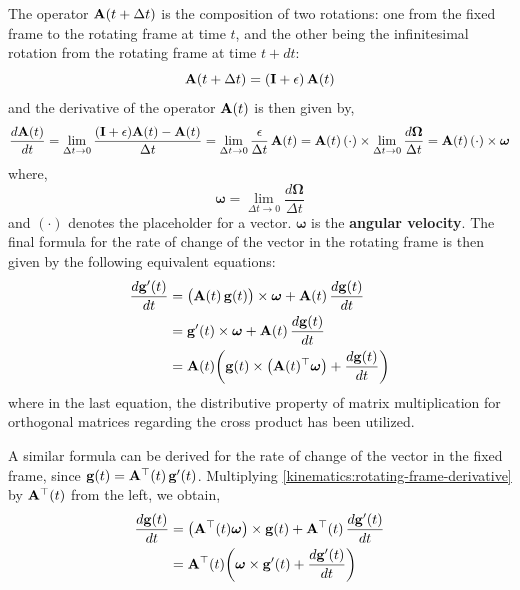 \documentclass[12pt]{article}
\begin{document}
The operator $\vb{A}(t+\Delta t)$ is the composition of two rotations: one from the fixed
frame to the rotating frame at time $t$, and the other being the infinitesimal rotation from
the rotating frame at time $t + dt$:
\begin{equation}
  \vb{A}(t+\Delta t) = (\vb{I} + \epsilon)\,\vb{A}(t)
\end{equation}
and the derivative of the operator $\vb{A}(t)$ is then given by,
\begin{equation}
  \frac{d\vb{A}(t)}{dt}
  = \lim_{\Delta t\to 0}\frac{(\vb{I}+\epsilon)\vb{A}(t) - \vb{A}(t)}{\Delta t}
  = \lim_{\Delta t\to 0}\frac{\epsilon}{\Delta t}\,\vb{A}(t)
  = \vb{A}(t)\,(\cdot)\times\lim_{\Delta t\to 0}\frac{d\boldsymbol{\Omega}}{\Delta t}
  = \vb{A}(t)\,(\cdot)\times\boldsymbol{\omega}
\end{equation}
where,
\begin{equation}
  \boldsymbol{\omega} = \lim_{\Delta t\to 0}\frac{d\boldsymbol{\Omega}}{\Delta t}
\end{equation}
and $(\cdot)$ denotes the placeholder for a vector. $\boldsymbol{\omega}$ is the
\textbf{angular velocity}. The final formula for the rate of change of the vector in the
rotating frame is then given by the following equivalent equations:
\begin{align}
  \frac{d\vb{g}'(t)}{dt}
    &= \bigl(\vb{A}(t)\,\vb{g}(t)\bigr) \times \boldsymbol{\omega}
       + \vb{A}(t)\,\frac{d\vb{g}(t)}{dt} \nonumber \\
    &= \vb{g}'(t) \times \boldsymbol{\omega} + \vb{A}(t)\,\frac{d\vb{g}(t)}{dt} \nonumber \\
    &= \vb{A}(t)\!\left(\vb{g}(t) \times \bigl(\vb{A}(t)^\top\boldsymbol{\omega}\bigr)
       + \frac{d\vb{g}(t)}{dt}\right)
  \label{kinematics:rotating-frame-derivative}
\end{align}
where in the last equation, the distributive property of matrix multiplication for orthogonal
matrices regarding the cross product has been utilized.

A similar formula can be derived for the rate of change of the vector in the fixed frame,
since $\vb{g}(t) = \vb{A}^\top(t)\,\vb{g}'(t)$. Multiplying \eqref{kinematics:rotating-frame-derivative} by
$\vb{A}^\top(t)$ from the left, we obtain,
\begin{align}
  \frac{d\vb{g}(t)}{dt}
    &= \bigl(\vb{A}^\top(t)\boldsymbol{\omega}\bigr) \times \vb{g}(t)
       + \vb{A}^\top(t)\,\frac{d\vb{g}'(t)}{dt} \nonumber \\
    &= \vb{A}^\top(t)\!\left(\boldsymbol{\omega} \times \vb{g}'(t)
       + \frac{d\vb{g}'(t)}{dt}\right)
  \label{kinematics:inertial-frame-derivative}
\end{align}
\end{document}
